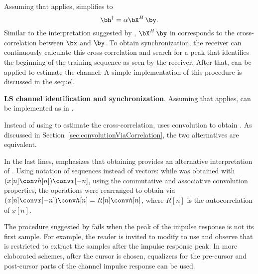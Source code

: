 Assuming that  applies,  simplifies to
\begin{equation}
{\bh}^\dag = \alpha \bX^{H} \,  \by.
\label{eq:ls_simplified_solution}
\end{equation}
Similar to the interpretation suggested by
, $\bX^{H} \,  \by$ in 
corresponds to the cross-correlation between $\bx$ and $\by$. To obtain synchronization,
the receiver can continuously calculate this cross-correlation and search for a peak
that identifies the beginning of the training sequence as seen by the receiver. After that,
 can be applied to estimate the channel.
A simple implementation of this procedure is discussed in the sequel.

\bExample \textbf{LS channel identification and synchronization}.
Assuming that  applies, 
 can be implemented as in .


Instead of using  to estimate the cross-correlation, 
 uses convolution to obtain .
As discussed in Section~\ref{sec:convolutionViaCorrelation}, the two alternatives
are equivalent.

In the last lines,  emphasizes that obtaining 
provides an alternative interpretation of . Using notation of sequences instead of vectors: while  was obtained with $(x[n] \conv h[n]) \conv x[-n]$, using the commutative
and associative convolution properties, the operations were rearranged to obtain  via
$(x[n] \conv x[-n]) \conv h[n] = R[n] \conv h[n]$, where $R[n]$ is the autocorrelation of $x[n]$.

The procedure suggested by  fails when the
peak of the impulse response is not its first sample. For example, 
the reader is invited to modify  to
use  and observe that  is restricted to extract the samples after the impulse response peak.
In more elaborated schemes, after the cursor is chosen, equalizers for the pre-cursor and 
post-cursor parts of the channel impulse response can be used.
\eExample

